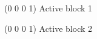 %
%
%
%

\begin{iteblock}
\ITE(0 0 0 1) Active block 1
\end{iteblock}



\begin{iteblock}
\ITE(0 0 0 1) Active block 2
\end{iteblock}


